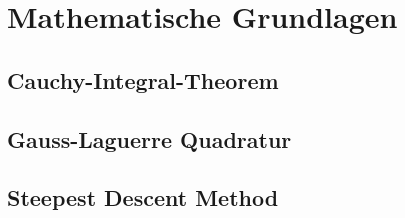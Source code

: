\chapter{Mathematische Grundlagen}

\section{Cauchy-Integral-Theorem}

\section{Gauss-Laguerre Quadratur}

\section{Steepest Descent Method}

